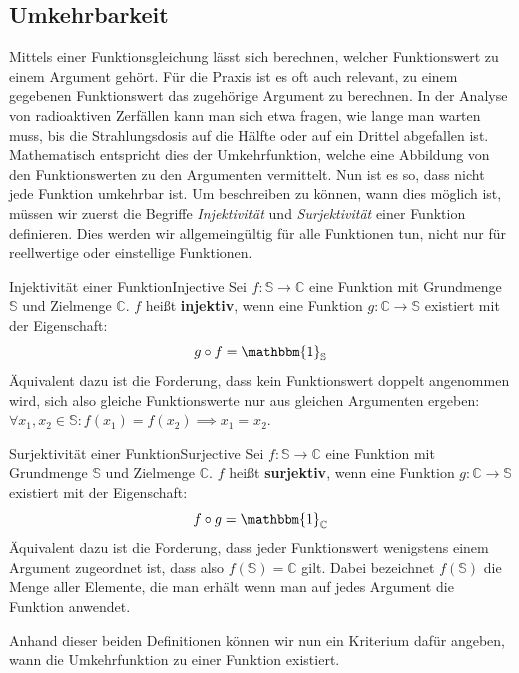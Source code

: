 \subsection{Umkehrbarkeit}

Mittels einer Funktionsgleichung lässt sich berechnen, welcher Funktionswert zu einem Argument gehört. Für die Praxis ist es oft auch relevant, zu einem gegebenen Funktionswert das zugehörige Argument zu berechnen. In der Analyse von radioaktiven Zerfällen kann man sich etwa fragen, wie lange man warten muss, bis die Strahlungsdosis auf die Hälfte oder auf ein Drittel abgefallen ist. Mathematisch entspricht dies der Umkehrfunktion, welche eine Abbildung von den Funktionswerten zu den Argumenten vermittelt. Nun ist es so, dass nicht jede Funktion umkehrbar ist. Um beschreiben zu können, wann dies möglich ist, müssen wir zuerst die Begriffe \emph{Injektivität} und \emph{Surjektivität} einer Funktion definieren. Dies werden wir allgemeingültig für alle Funktionen tun, nicht nur für reellwertige oder einstellige Funktionen.

\begin{definition}{Injektivität einer Funktion}{Injective}
    Sei $f: \mathbb{S} \to \mathbb{C}$ eine Funktion mit Grundmenge $\mathbb{S}$ und Zielmenge $\mathbb{C}$. $f$ heißt \textbf{injektiv}, wenn eine Funktion $g: \mathbb{C} \to \mathbb{S}$ existiert mit der Eigenschaft:
    $$
    g \circ f = \mathbbm{1}_\mathbb{S}
    $$
    Äquivalent dazu ist die Forderung, dass kein Funktionswert doppelt angenommen wird, sich also gleiche Funktionswerte nur aus gleichen Argumenten ergeben: $\forall x_1,x_2\in\mathbb{S}: f(x_1)=f(x_2) \implies x_1=x_2$.
\end{definition}

\begin{definition}{Surjektivität einer Funktion}{Surjective}
    Sei $f: \mathbb{S} \to \mathbb{C}$ eine Funktion mit Grundmenge $\mathbb{S}$ und Zielmenge $\mathbb{C}$. $f$ heißt \textbf{surjektiv}, wenn eine Funktion $g: \mathbb{C} \to \mathbb{S}$ existiert mit der Eigenschaft:
    $$
    f \circ g = \mathbbm{1}_\mathbb{C}
    $$
    Äquivalent dazu ist die Forderung, dass jeder Funktionswert wenigstens einem Argument zugeordnet ist, dass also $f(\mathbb{S}) = \mathbb{C}$ gilt. Dabei bezeichnet $f(\mathbb{S})$ die Menge aller Elemente, die man erhält wenn man auf jedes Argument die Funktion anwendet.
\end{definition}

Anhand dieser beiden Definitionen können wir nun ein Kriterium dafür angeben, wann die Umkehrfunktion zu einer Funktion existiert.

